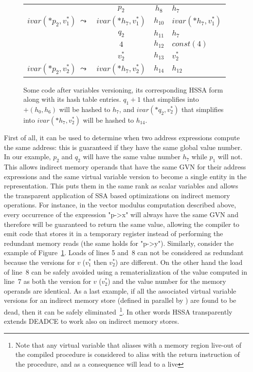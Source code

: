 \begin{figure}
\begin{center}
{\begin{tabular}{rc|c|l}
    &$p_2$                 & $h_8$   & $h_7$\\
    $ivar(*p_2,v^*_1)\ \leadsto$& $ivar(*h_7,v^*_1)$      & $h_{10}$ &$ivar(*h_7,v^*_1)$\\
    &$q_2$                 & $h_{11}$ & $h_7$\\
    &$4$                   & $h_{12}$ & $const(4)$\\
    &$v^*_2$               & $h_{13}$   &  $v^*_2$\\
    $ivar(*p_2,v^*_2)\ \leadsto$& $ivar(*h_7,v^*_2)$      & $h_{14}$ &$h_{12}$\\
  \end{tabular}
}
\end{center}
\caption{\label{fig:hssa:versioning}Some code after variables versioning, its corresponding HSSA form along with its hash table entries. $q_1+1$ that simplifies into $ +(h_0,h_6)$ will be hashed to $h_7$, and $ivar(*q_2,v^*_2)$ that simplifies into $ivar(*h_7,v^*_2)$ will be hashed to $h_{14}$.
}
\end{figure}

First of all, it can be used to determine when two address expressions compute the same address: this is guaranteed if they have the same global value number. In our example, $p_2$ and $q_2$ will have the same value number $h_7$ while $p_1$ will not.
This allows indirect memory operands that have the same GVN for their address expressions and the same virtual variable version to become a single entity in the representation. This puts them in the same rank as scalar variables and allows the transparent application of SSA based optimizations on indirect memory operations.
For instance, in the vector modulus computation described above, every occurrence of the expression "p-\textgreater x" will always have the same GVN and therefore will be guaranteed to return the same value, allowing the compiler to emit code that stores it in a temporary register instead of performing the redundant memory reads (the same holds for "p-\textgreater y").
Similarly, consider the example of Figure~\ref{fig:hssa:versioning}. Loads of lines 5 and~8 can not be considered as redundant because the versions for $v$ ($v_1^*$ then $v_2^*$) are different. On the other hand the load of line~8 can be safely avoided using a rematerialization of the value computed in line~7 as both the version for $v$ ($v_2^*$) and the value number for the memory operands are identical. 
As a last example, if all the associated virtual variable versions for an indirect memory store (defined in parallel by \chifuns) are found to be dead, then it can be safely eliminated~\footnote{Note that any virtual variable that aliases with a memory region live-out of the compiled procedure is considered to alias with the return instruction of the procedure, and as a consequence will lead to a live \mufun}. In other words HSSA transparently extends DEADCE to work also on indirect memory stores.

